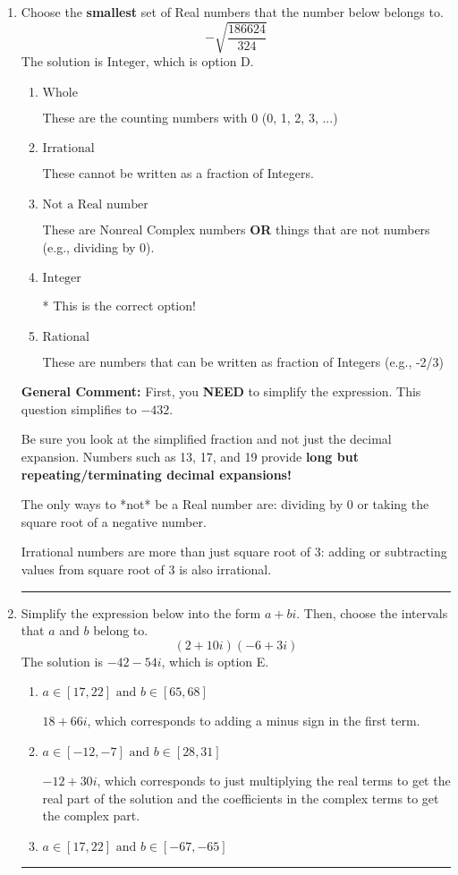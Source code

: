 \documentclass{extbook}[14pt]
\newcommand{\litem}[1]{\item #1

\rule{\textwidth}{0.4pt}}
\begin{document}
\begin{enumerate}\litem{
Choose the \textbf{smallest} set of Real numbers that the number below belongs to.
\[ -\sqrt{\frac{186624}{324}} \]
The solution is \( \text{Integer} \), which is option D.\begin{enumerate}[label=\Alph*.]
\item \( \text{Whole} \)

These are the counting numbers with 0 (0, 1, 2, 3, ...)
\item \( \text{Irrational} \)

These cannot be written as a fraction of Integers.
\item \( \text{Not a Real number} \)

These are Nonreal Complex numbers \textbf{OR} things that are not numbers (e.g., dividing by 0).
\item \( \text{Integer} \)

* This is the correct option!
\item \( \text{Rational} \)

These are numbers that can be written as fraction of Integers (e.g., -2/3)
\end{enumerate}

\textbf{General Comment:} First, you \textbf{NEED} to simplify the expression. This question simplifies to $-432$. 
 
 Be sure you look at the simplified fraction and not just the decimal expansion. Numbers such as 13, 17, and 19 provide \textbf{long but repeating/terminating decimal expansions!} 
 
 The only ways to *not* be a Real number are: dividing by 0 or taking the square root of a negative number. 
 
 Irrational numbers are more than just square root of 3: adding or subtracting values from square root of 3 is also irrational.
}
\litem{
Simplify the expression below into the form $a+bi$. Then, choose the intervals that $a$ and $b$ belong to.
\[ (2 + 10 i)(-6 + 3 i) \]
The solution is \( -42 - 54 i \), which is option E.\begin{enumerate}[label=\Alph*.]
\item \( a \in [17, 22] \text{ and } b \in [65, 68] \)

 $18 + 66 i$, which corresponds to adding a minus sign in the first term.
\item \( a \in [-12, -7] \text{ and } b \in [28, 31] \)

 $-12 + 30 i$, which corresponds to just multiplying the real terms to get the real part of the solution and the coefficients in the complex terms to get the complex part.
\item \( a \in [17, 22] \text{ and } b \in [-67, -65] \)


\end{enumerate}}
\end{enumerate}
\end{document}
